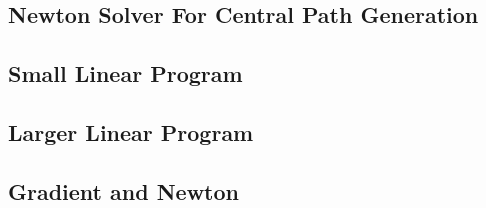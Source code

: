 \documentclass[11pt,a4paper]{article}
\begin{document}
\newpage
\subsection{Newton Solver For Central Path Generation}


\newpage
\subsection{Small Linear Program}


\newpage
\subsection{Larger Linear Program}


\newpage
\subsection{Gradient and Newton}

\end{document}
